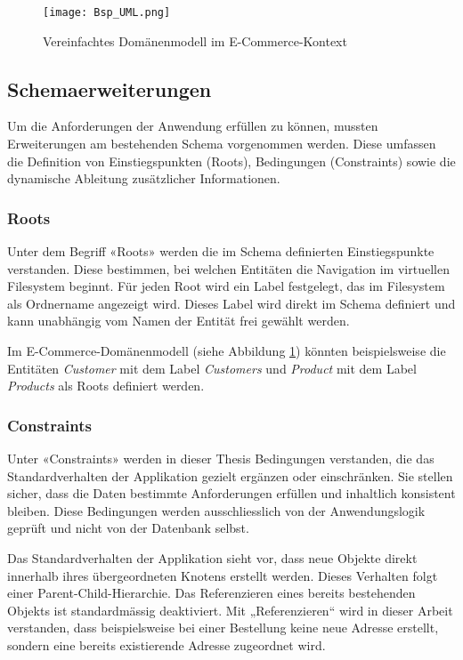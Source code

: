 \begin{figure}[H]
    \centering
    \texttt{[image: Bsp\_UML.png]}
    \caption{Vereinfachtes Domänenmodell im E-Commerce-Kontext}
    \label{fig:uml_domaenenmodell}
\end{figure}

\subsection{Schemaerweiterungen}
Um die Anforderungen der Anwendung erfüllen zu können, mussten Erweiterungen am bestehenden Schema vorgenommen werden. Diese umfassen die Definition von Einstiegspunkten (Roots), Bedingungen (Constraints) sowie die dynamische Ableitung zusätzlicher Informationen.

\label{ab:con}
\subsubsection{Roots}
Unter dem Begriff «Roots» werden die im Schema definierten Einstiegspunkte verstanden. Diese bestimmen, bei welchen Entitäten die Navigation im virtuellen Filesystem beginnt. Für jeden Root wird ein Label festgelegt, das im Filesystem als Ordnername angezeigt wird. Dieses Label wird direkt im Schema definiert und kann unabhängig vom Namen der Entität frei gewählt werden.

Im E-Commerce-Domänenmodell (siehe Abbildung \ref{fig:uml_domaenenmodell}) könnten beispielsweise die Entitäten \textit{Customer} mit dem Label \textit{Customers} und \textit{Product} mit dem Label \textit{Products} als Roots definiert werden.

\subsubsection{Constraints}
Unter «Constraints» werden in dieser Thesis Bedingungen verstanden, die das Standardverhalten der Applikation gezielt ergänzen oder einschränken. Sie stellen sicher, dass die Daten bestimmte Anforderungen erfüllen und inhaltlich konsistent bleiben. Diese Bedingungen werden ausschliesslich von der Anwendungslogik geprüft und nicht von der Datenbank selbst.

Das Standardverhalten der Applikation sieht vor, dass neue Objekte direkt innerhalb ihres übergeordneten Knotens erstellt werden. Dieses Verhalten folgt einer Parent-Child-Hierarchie. Das Referenzieren eines bereits bestehenden Objekts ist standardmässig deaktiviert. Mit „Referenzieren“ wird in dieser Arbeit verstanden, dass beispielsweise bei einer Bestellung keine neue Adresse erstellt, sondern eine bereits existierende Adresse zugeordnet wird.

